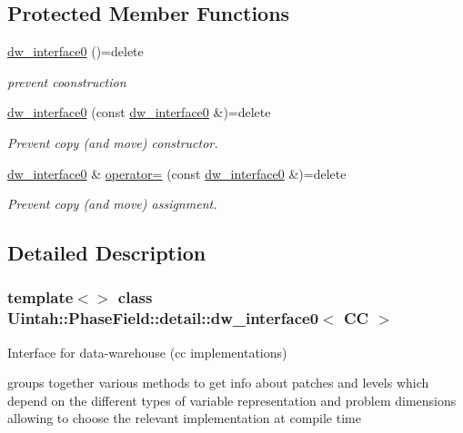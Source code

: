 \subsection*{Protected Member Functions}
\begin{DoxyCompactItemize}
\item 
\hyperlink{classUintah_1_1PhaseField_1_1detail_1_1dw__interface0_3_01CC_01_4_adb6d19a0028b35dce581e0d110ad99a0}{dw\+\_\+interface0} ()=delete
\begin{DoxyCompactList}\small\item\em prevent coonstruction \end{DoxyCompactList}\item 
\hyperlink{classUintah_1_1PhaseField_1_1detail_1_1dw__interface0_3_01CC_01_4_a07c134f8f27e061e5f4c4641f0ec9ad8}{dw\+\_\+interface0} (const \hyperlink{classUintah_1_1PhaseField_1_1detail_1_1dw__interface0}{dw\+\_\+interface0} \&)=delete
\begin{DoxyCompactList}\small\item\em Prevent copy (and move) constructor. \end{DoxyCompactList}\item 
\hyperlink{classUintah_1_1PhaseField_1_1detail_1_1dw__interface0}{dw\+\_\+interface0} \& \hyperlink{classUintah_1_1PhaseField_1_1detail_1_1dw__interface0_3_01CC_01_4_a4e44be489fb9c660a8584c95b4e104b8}{operator=} (const \hyperlink{classUintah_1_1PhaseField_1_1detail_1_1dw__interface0}{dw\+\_\+interface0} \&)=delete
\begin{DoxyCompactList}\small\item\em Prevent copy (and move) assignment. \end{DoxyCompactList}\end{DoxyCompactItemize}


\subsection{Detailed Description}
\subsubsection*{template$<$$>$\newline
class Uintah\+::\+Phase\+Field\+::detail\+::dw\+\_\+interface0$<$ C\+C $>$}

Interface for data-\/warehouse (cc implementations) 

groups together various methods to get info about patches and levels which depend on the different types of variable representation and problem dimensions allowing to choose the relevant implementation at compile time

